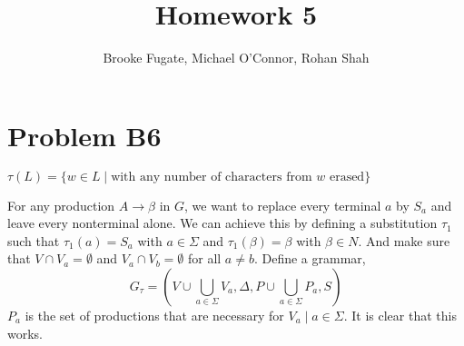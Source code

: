 \documentclass[12pt]{article}
\begin{document}
\pagestyle{plain}
\titleformat{\subsection}[runin]
  {\normalfont\large\bfseries}{\thesubsection}{1em}{}

\title{Homework 5}
\author{Brooke Fugate, Michael O'Connor, Rohan Shah}
\date{}

\maketitle

\section*{Problem B6}

$\tau(L) = \{w \in L \mid \text{with any number of characters from } w \text{ erased}\}$\newline 

For any production $A \rightarrow \beta$ in $G$, we want to replace every terminal $a$ by $S_a$ and leave every nonterminal alone. We can achieve this by defining a substitution $\tau_1$ such that $\tau_1(a)=S_a$ with $a \in \Sigma$ and $\tau_1(\beta)=\beta$ with $\beta \in N$. And make sure that $V \cap V_a = \emptyset$ and $V_a \cap V_b = \emptyset$ for all $a \neq b$. \newline
Define a grammar, $$G_{\tau} = (V \cup \bigcup_{a \in \Sigma} V_a, \Delta, P \cup \bigcup_{a \in \Sigma} P_a, S)$$ $P_a$ is the set of productions that are necessary for $V_a \mid a \in \Sigma$. It is clear that this works.
\end{document}
